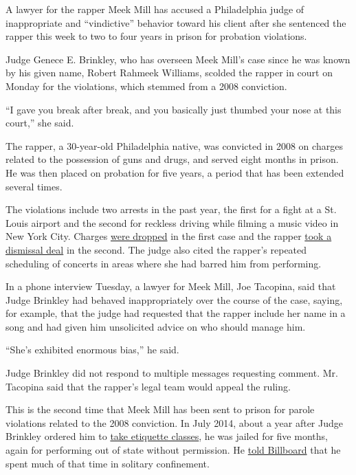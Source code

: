 A lawyer for the rapper Meek Mill has accused a Philadelphia judge of
inappropriate and ``vindictive'' behavior toward his client after she
sentenced the rapper this week to two to four years in prison for
probation violations.

Judge Genece E. Brinkley, who has overseen Meek Mill's case since he was
known by his given name, Robert Rahmeek Williams, scolded the rapper in
court on Monday for the violations, which stemmed from a 2008
conviction.

``I gave you break after break, and you basically just thumbed your nose
at this court,'' she said.

The rapper, a 30-year-old Philadelphia native, was convicted in 2008 on
charges related to the possession of guns and drugs, and served eight
months in prison. He was then placed on probation for five years, a
period that has been extended several times.

The violations include two arrests in the past year, the first for a
fight at a St. Louis airport and the second for reckless driving while
filming a music video in New York City. Charges
\href{http://www.billboard.com/articles/columns/hip-hop/8006993/meek-mill-misdemeanor-airport-assault-charges-dropped}{were
dropped} in the first case and the rapper
\href{https://pagesix.com/2017/10/11/meek-mill-catches-break-on-popping-wheelies-case/}{took
a dismissal deal} in the second. The judge also cited the rapper's
repeated scheduling of concerts in areas where she had barred him from
performing.

In a phone interview Tuesday, a lawyer for Meek Mill, Joe Tacopina, said
that Judge Brinkley had behaved inappropriately over the course of the
case, saying, for example, that the judge had requested that the rapper
include her name in a song and had given him unsolicited advice on who
should manage him.

``She's exhibited enormous bias,'' he said.

Judge Brinkley did not respond to multiple messages requesting comment.
Mr. Tacopina said that the rapper's legal team would appeal the ruling.

This is the second time that Meek Mill has been sent to prison for
parole violations related to the 2008 conviction. In July 2014, about a
year after Judge Brinkley ordered him to
\href{http://www.nydailynews.com/entertainment/gossip/rapper-meek-mill-ordered-etiquette-classes-article-1.1386399}{take
etiquette classes}, he was jailed for five months, again for performing
out of state without permission. He
\href{http://www.billboard.com/articles/columns/the-juice/6649158/meek-mill-interview-prison-time-nicki-minaj-etiquette-class-video}{told
Billboard} that he spent much of that time in solitary confinement.

